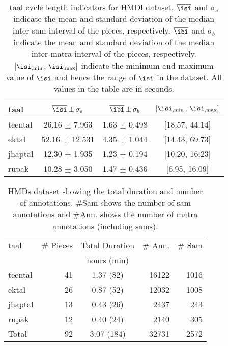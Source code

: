 \begin{table}[t]
\begin{center}
\begin{tabular}{@{}lccc@{}}
\toprule 
\Gls{taal} & $\overline{\isi} \pm \sigma_s$ & $\overline{\ibi} \pm \sigma_b$  & $[{\isi}_{,\min} \, , \,  {\isi}_{,\max} ]$ \tabularnewline
\midrule 
\Gls{teental} & 26.16 $\pm$ 7.963  & 1.63 $\pm$ 0.498 & {[}18.57, 44.14{]}\tabularnewline
\Gls{ektal} & 52.16 $\pm$ 12.531 & 4.35 $\pm$ 1.044 & {[}14.43, 69.73{]}\tabularnewline
\Gls{jhaptal} & 12.30 $\pm$ 1.935 & 1.23 $\pm$ 0.194 & {[}10.20, 16.23{]}\tabularnewline
\Gls{rupak} & 10.28 $\pm$ 3.050 & 1.47 $\pm$ 0.436 & {[}6.95, 16.09{]}\tabularnewline
\bottomrule 
\end{tabular}
\end{center}
\protect\caption[\Gls{taal} cycle length indicators for \acrshort{HMDl} dataset]{\Gls{taal} cycle length indicators for \acrshort{HMDl} dataset. $\overline{\isi}$ and $\sigma_s$ indicate the mean and standard deviation of the median inter-\gls{sam} interval of the pieces, respectively. $\overline{\ibi}$ and $\sigma_b$ indicate the mean and standard deviation of the median inter-\gls{matra} interval of the pieces, respectively. $[{\isi}_{,\min} \, , \,  {\isi}_{,\max}]$ indicate the minimum and maximum value of $\isi$ and hence the range of $\isi$ in the dataset. All values in the table are in seconds.}
\label{tab:datastat:hmdl}
\end{table}
\begin{table}[t]
\begin{center}
\begin{tabular}{@{}lrcrr@{}}
\toprule 
\Gls{taal} & \# Pieces & Total Duration & \# Ann. & \# Sam\tabularnewline
 &  & hours (min) &  & \tabularnewline
\midrule 
\Gls{teental} & 41 & 1.37 (82) & 16122 & 1016\tabularnewline
\Gls{ektal} & 26 & 0.87 (52) & 12032 & 1008\tabularnewline
\Gls{jhaptal} & 13 & 0.43 (26) & 2437 & 243\tabularnewline
\Gls{rupak} & 12 & 0.40 (24) & 2140 & 305\tabularnewline
\midrule 
Total & 92 & 3.07 (184) & 32731 & 2572\tabularnewline
\bottomrule 
\end{tabular}
\end{center}
\protect\caption[\acrshort{HMDs} dataset description]{\acrshort{HMDs} dataset showing the total duration and number of annotations. \#Sam shows the number of \gls{sam} annotations and \#Ann. shows the number of \gls{matra} annotations (including \glspl{sam}).}
\label{tab:dataset:hmds}
\end{table}
